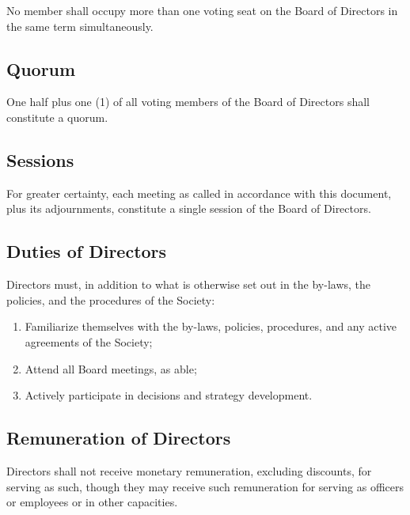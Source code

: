 No member shall occupy more than one voting seat on the Board of Directors in
the same term simultaneously. 

\subsection{Quorum}
One half plus one (1) of all voting members of the Board of Directors shall
constitute a quorum.

\subsection{Sessions}
For greater certainty, each meeting as called in accordance with this document,
plus its adjournments, constitute a single session of the Board of Directors.

\subsection{Duties of Directors}
Directors must, in addition to what is otherwise set out in the by-laws, the
policies, and the procedures of the Society:
\begin{enumerate}
    \item Familiarize themselves with the by-laws, policies, 
        procedures, and any active agreements of the Society;
    \item Attend all Board meetings, as able;
    \item Actively participate in decisions and strategy development.
\end{enumerate}

\subsection{Remuneration of Directors}
Directors shall not receive monetary remuneration, excluding discounts, for
serving as such, though they may receive such remuneration for serving as
officers or employees or in other capacities.
